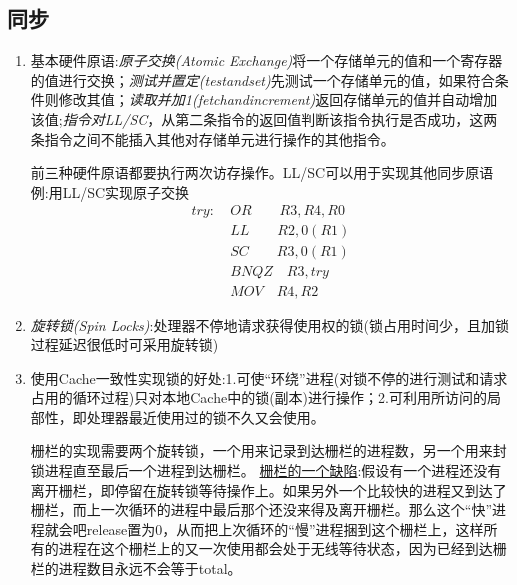 \documentclass[a4paper]{ctexart}
\newcommand{\li}{\uline{\hspace{0.5em}}}
\begin{document}
\subsection{同步}
\begin{enumerate}
  \item 基本硬件原语:\emph{原子交换(Atomic Exchange)}将一个存储单元的值和一个寄存器的值进行交换；\emph{测试并置定(test\li and\li set)}先测试一个存储单元的值，如果符合条件则修改其值；\emph{读取并加1(fetch\li and\li increment)}返回存储单元的值并自动增加该值;\emph{指令对LL/SC}，从第二条指令的返回值判断该指令执行是否成功，这两条指令之间不能插入其他对存储单元进行操作的其他指令。

前三种硬件原语都要执行两次访存操作。LL/SC可以用于实现其他同步原语
例:用LL/SC实现原子交换
\begin{equation}
\begin{split}
  try:\ &OR \qquad R3, R4, R0 \\
  &LL  \qquad R2, 0(R1) \\
  &SC \qquad R3, 0(R1) \\
  &BNQZ  \quad R3, try \\
  &MOV \quad R4, R2
\end{split}
\end{equation}

\item \emph{旋转锁(Spin Locks)}:处理器不停地请求获得使用权的锁(锁占用时间少，且加锁过程延迟很低时可采用旋转锁)
\item 使用Cache一致性实现锁的好处:1.可使“环绕”进程(对锁不停的进行测试和请求占用的循环过程)只对本地Cache中的锁(副本)进行操作；2.可利用所访问的局部性，即处理器最近使用过的锁不久又会使用。


栅栏的实现需要两个旋转锁，一个用来记录到达栅栏的进程数，另一个用来封锁进程直至最后一个进程到达栅栏。
\underline{栅栏的一个缺陷}:假设有一个进程还没有离开栅栏，即停留在旋转锁等待操作上。如果另外一个比较快的进程又到达了栅栏，而上一次循环的进程中最后那个还没来得及离开栅栏。那么这个“快”进程就会吧release置为0，从而把上次循环的“慢”进程捆到这个栅栏上，这样所有的进程在这个栅栏上的又一次使用都会处于无线等待状态，因为已经到达栅栏的进程数目永远不会等于total。

\end{enumerate}
\end{document}
